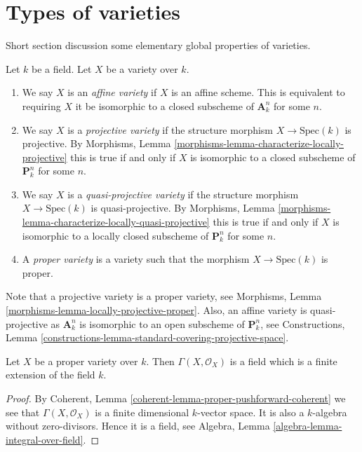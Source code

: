 \section{Types of varieties}
\label{section-types}

\noindent
Short section discussion some elementary global properties of varieties.

\begin{definition}
\label{definition-variety-type}
Let $k$ be a field. Let $X$ be a variety over $k$.
\begin{enumerate}
\item We say $X$ is an {\it affine variety} if $X$ is an affine scheme.
This is equivalent to requiring $X$ it be isomorphic to a closed
subscheme of $\mathbf{A}^n_k$ for some $n$.
\item We say $X$ is a {\it projective variety} if the
structure morphism $X \to \text{Spec}(k)$ is projective. By
Morphisms, Lemma \ref{morphisms-lemma-characterize-locally-projective}
this is true if and only if $X$ is isomorphic to a closed
subscheme of $\mathbf{P}^n_k$ for some $n$.
\item We say $X$ is a {\it quasi-projective variety} if
the structure morphism $X \to \text{Spec}(k)$ is quasi-projective. By
Morphisms, Lemma \ref{morphisms-lemma-characterize-locally-quasi-projective}
this is true if and only if $X$ is isomorphic to a
locally closed subscheme of $\mathbf{P}^n_k$ for some $n$.
\item A {\it proper variety} is a variety such that the
morphism $X \to \text{Spec}(k)$ is proper.
\end{enumerate}
\end{definition}

\noindent
Note that a projective variety is a proper variety, see
Morphisms, Lemma \ref{morphisms-lemma-locally-projective-proper}.
Also, an affine variety is quasi-projective as $\mathbf{A}^n_k$
is isomorphic to an open subscheme of $\mathbf{P}^n_k$, see
Constructions,
Lemma \ref{constructions-lemma-standard-covering-projective-space}.

\begin{lemma}
\label{lemma-regular-functions-proper-variety}
Let $X$ be a proper variety over $k$.
Then $\Gamma(X, \mathcal{O}_X)$ is a field which is
a finite extension of the field $k$.
\end{lemma}

\begin{proof}
By
Coherent, Lemma \ref{coherent-lemma-proper-pushforward-coherent}
we see that $\Gamma(X, \mathcal{O}_X)$ is a finite dimensional
$k$-vector space. It is also a $k$-algebra without zero-divisors.
Hence it is a field, see
Algebra, Lemma \ref{algebra-lemma-integral-over-field}.
\end{proof}




